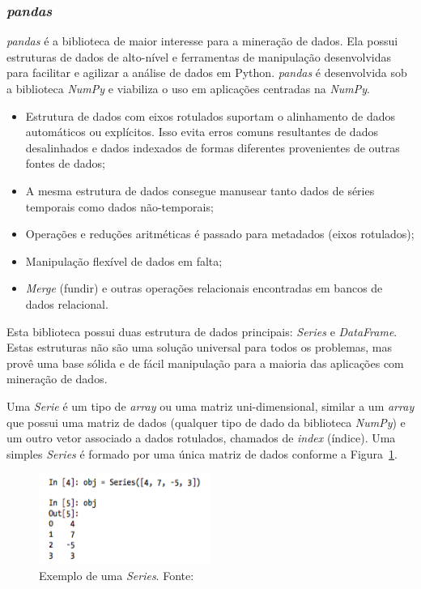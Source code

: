 \subsubsection{\textit{pandas}}
\textit{pandas} é a biblioteca de maior interesse para a mineração de dados. Ela possui estruturas de dados de alto-nível e ferramentas de manipulação desenvolvidas para facilitar e agilizar a análise de dados em Python. \textit{pandas} é desenvolvida sob a biblioteca \textit{NumPy} e viabiliza o uso em aplicações centradas na \textit{NumPy}. \cite{python-analysis}

\begin{itemize}
    \item Estrutura de dados com eixos rotulados suportam o alinhamento de dados automáticos ou explícitos. Isso evita erros comuns resultantes de dados desalinhados e dados indexados de formas diferentes provenientes de outras fontes de dados;
    \item A mesma estrutura de dados consegue manusear tanto dados de séries temporais como dados não-temporais;
    \item Operações e reduções aritméticas é passado para metadados (eixos rotulados);
    \item Manipulação flexível de dados em falta;
    \item \textit{Merge} (fundir) e outras operações relacionais encontradas em bancos de dados relacional.
\end{itemize}

Esta biblioteca possui duas estrutura de dados principais: \textit{Series} e \textit{DataFrame}. Estas estruturas não são uma solução universal para todos os problemas, mas provê uma base sólida e de fácil manipulação para a maioria das aplicações com mineração de dados.

Uma \textit{Serie} é um tipo de \textit{array} ou uma matriz uni-dimensional, similar a um \textit{array} que possui uma matriz de dados (qualquer tipo de dado da biblioteca \textit{NumPy}) e um outro vetor associado a dados rotulados, chamados de \textit{index} (índice). Uma simples \textit{Series} é formado por uma única matriz de dados conforme a Figura~\ref{pandas-series}.

\begin{figure}[h!]
	\centering
	\includegraphics[width=0.5\textwidth]{Cap4/imagens/pandas-series}
	\caption{Exemplo de uma \textit{Series}. Fonte: }
	\label{pandas-series}
\end{figure}

